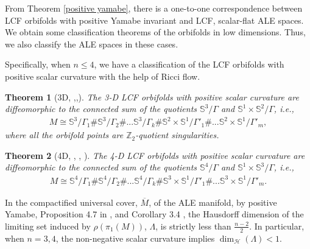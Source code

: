 \documentclass[12pt]{amsart}
\newtheorem{theorem}{Theorem}[section]
\theoremstyle{definition}
\begin{document}
From Theorem \ref{positive yamabe}, there is a one-to-one correspondence between LCF orbifolds with positive Yamabe invariant and LCF, scalar-flat ALE spaces. We obtain some classification theorems of the orbifolds in low dimensions. Thus, we also classify the ALE spaces in these cases.

Specifically, when $n\leq 4$, we have a classification of the LCF orbifolds with positive scalar curvature with the help of Ricci flow.

\begin{theorem}[3D, \cite{GL},\cite{Ilimit},\cite{KL}]\label{3d} The 3-D LCF orbifolds with positive scalar curvature are diffeomorphic to the connected sum of the quotients $\mathbb{S}^3/\Gamma$ and $\mathbb{S}^1\times \mathbb{S}^2/\Gamma$, i.e.,
\begin{align*}
    M\cong \mathbb{S}^3/\Gamma_1\#\mathbb{S}^3/\Gamma_2\#...\mathbb{S}^3/\Gamma_k\#\mathbb{S}^2\times \mathbb{S}^1/\Gamma'_1\#...\mathbb{S}^2\times \mathbb{S}^1/\Gamma'_m,
\end{align*}
where all the orbifold points are $\mathbb{Z}_2$-quotient singularities.
\end{theorem}

\begin{theorem}[4D, \cite{Ilimit}, \cite{Ha}, \cite{ChenZhu}]\label{4d}
    The 4-D LCF orbifolds with positive scalar curvature are diffeomorphic to the connected sum of the quotients $\mathbb{S}^4/\Gamma$ and $\mathbb{S}^1\times \mathbb{S}^3/\Gamma$, i.e.,
    \begin{align*}
    M\cong \mathbb{S}^4/\Gamma_1\#\mathbb{S}^4/\Gamma_2\#...\mathbb{S}^4/\Gamma_k\#\mathbb{S}^3\times \mathbb{S}^1/\Gamma'_1\#...\mathbb{S}^3\times \mathbb{S}^1/\Gamma'_m.
\end{align*}
\end{theorem}

In the compactified universal cover, $\overline{M}$, of the ALE manifold, by positive Yamabe, Proposition 4.7 in \cite{SYconformal}, and Corollary 3.4 \cite{Nayatani}, the Hausdorff dimension of the limiting set induced by $\rho(\pi_1(M))$, $\Lambda$, is strictly less than $\frac{n-2}{2}$. In particular, when $n = 3, 4$, the non-negative scalar curvature implies $\dim_{\mathcal{H}}(\Lambda)<1$.
\end{document}

